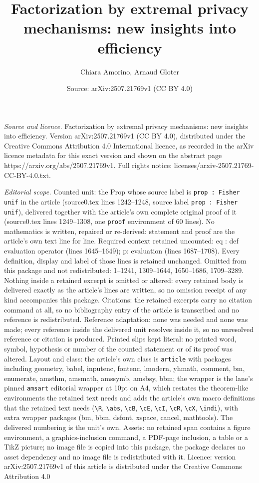 \documentclass[10pt,a4paper]{amsart}
\title[Factorization by extremal privacy mechanisms: new insights i]{Factorization by extremal privacy mechanisms: new insights into efficiency}
\author{Chiara Amorino, Arnaud Gloter}
\date{Source: arXiv:2507.21769v1 (CC BY 4.0)}
\begin{document}
\maketitle

\noindent\emph{Source and licence.} Factorization by extremal privacy mechanisms: new insights into efficiency. Version arXiv:2507.21769v1 (CC BY 4.0), distributed under the Creative Commons Attribution 4.0 International licence, as recorded in the arXiv licence metadata for this exact version and shown on the abstract page https://arxiv.org/abs/2507.21769v1. Full rights notice: licenses/arxiv-2507.21769-CC-BY-4.0.txt.\par\smallskip

\noindent\textit{Editorial scope.} Counted unit: the Prop whose source label is \texttt{prop : Fisher unif} in the article (source0.tex lines 1242--1248, source label \texttt{prop : Fisher unif}), delivered together with the article's own complete original proof of it (source0.tex lines 1249--1308, one \texttt{proof} environment of 60 lines). No mathematics is written, repaired or re-derived: statement and proof are the article's own text line for line. Required context retained uncounted: eq : def evaluation operator (lines 1645--1649); p: evaluation (lines 1687--1708). Every definition, display and label of those lines is retained unchanged. Omitted from this package and not redistributed: 1--1241, 1309--1644, 1650--1686, 1709--3289. Nothing inside a retained excerpt is omitted or altered: every retained body is delivered exactly as the article's lines are written, so no omission receipt of any kind accompanies this package. Citations: the retained excerpts carry no citation command at all, so no bibliography entry of the article is transcribed and no reference is redistributed. Reference adaptation: none was needed and none was made; every reference inside the delivered unit resolves inside it, so no unresolved reference or citation is produced. Printed slips kept literal: no printed word, symbol, hypothesis or number of the counted statement or of its proof was altered. Layout and class: the article's own class is \texttt{article} with packages including geometry, babel, inputenc, fontenc, lmodern, yhmath, comment, bm, enumerate, amsthm, amsmath, amssymb, amsbsy, bbm; the wrapper is the lane's pinned \texttt{amsart} editorial wrapper at 10pt on A4, which restates the theorem-like environments the retained text needs and adds the article's own macro definitions that the retained text needs (\texttt{\textbackslash R}, \texttt{\textbackslash abs}, \texttt{\textbackslash cB}, \texttt{\textbackslash cE}, \texttt{\textbackslash cI}, \texttt{\textbackslash cR}, \texttt{\textbackslash cX}, \texttt{\textbackslash indi}), with extra wrapper packages (bm, bbm, dsfont, xspace, cancel, mathtools). The delivered numbering is the unit's own. Assets: no retained span contains a figure environment, a graphics-inclusion command, a PDF-page inclusion, a table or a TikZ picture; no image file is copied into this package, the package declares no asset dependency and no image file is redistributed with it. Licence: version arXiv:2507.21769v1 of this article is distributed under the Creative Commons Attribution 4.0 
\end{document}
